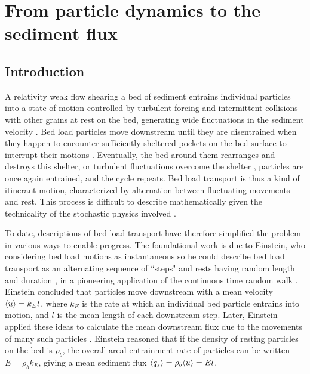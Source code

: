 
\chapter{From particle dynamics to the sediment flux}
\label{ch:flux}
\section{Introduction}

A relativity weak flow shearing a bed of sediment entrains individual particles into a state of motion controlled by turbulent forcing and intermittent collisions with other grains at rest on the bed, generating wide fluctuations in the sediment velocity \citep{Heyman2016,Fathel2015}.
Bed load particles move downstream until they are disentrained when they happen to encounter sufficiently sheltered pockets on the bed surface to interrupt their motions \citep{Charru2004,Gordon1972}.
Eventually, the bed around them rearranges and destroys this shelter, or turbulent fluctuations overcome the shelter \citep{Celik2014,Valyrakis2010}, particles are once again entrained, and the cycle repeats.
Bed load transport is thus a kind of itinerant motion, characterized by alternation between fluctuating movements and rest.
This process is difficult to describe mathematically given the technicality of the stochastic physics involved \citep{Furbish2017,Ancey2020}.

To date, descriptions of bed load transport have therefore simplified the problem in various ways to enable progress.
The foundational work is due to Einstein, who considering bed load motions as instantaneous so he could describe bed load transport as an alternating sequence of ``steps" and rests having random length and duration \citep{Einstein1937}, in a pioneering application of the continuous time random walk \citep{Montroll1965}.
Einstein concluded that particles move downstream with a mean velocity $\langle u \rangle = k_E l$, where $k_E$ is the rate at which an individual bed particle entrains into motion, and $l$ is the mean length of each downstream step.
Later, Einstein applied these ideas to calculate the mean downstream flux due to the movements of many such particles \citep{Einstein1950}. Einstein reasoned that if the density of resting particles on the bed is $\rho_b$, the overall areal entrainment rate of particles can be written $E = \rho_b k_E$, giving a mean sediment flux $\langle q_s \rangle = \rho_b \langle u \rangle  = El $.

